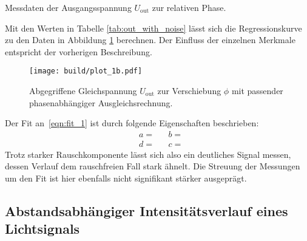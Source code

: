 \begin{table}[H]
	\vspace{1.35ex}
	\centering
	\captionsetup{width=0.75\linewidth}
	\caption{Messdaten der Ausgangsspannung $U_{\! \text{out}}$ zur relativen Phase.}
	
	\label{tab:out_with_noise}
\end{table}

Mit den Werten in Tabelle \ref{tab:out_with_noise} lässt sich die Regressionskurve zu den Daten in Abbildung
\ref{fig:out_with_noise} berechnen. Der Einfluss der einzelnen Merkmale entspricht der vorherigen Beschreibung.

\begin{figure}[H]
	\texttt{[image: build/plot\_1b.pdf]}
	\caption{Abgegriffene Gleichspannung $U_{\! \text{out}}$ zur Verschiebung $\phi$ mit passender
			 phasenabhängiger Ausgleichsrechnung.}
	\label{fig:out_with_noise}
\end{figure}

Der Fit an~\eqref{eqn:fit_1} ist durch folgende Eigenschaften beschrieben:
\begin{align*}
	&a =  &
	&b =  \\
	&d =  &
	&c = 
\end{align*}
Trotz starker Rauschkomponente lässt sich also ein deutliches Signal messen, dessen Verlauf dem rauschfreien
Fall stark ähnelt. Die Streuung der Messungen um den Fit ist hier ebenfalls nicht signifikant stärker
ausgeprägt.

\newpage

\subsection{Abstandsabhängiger Intensitätsverlauf eines Lichtsignals}

